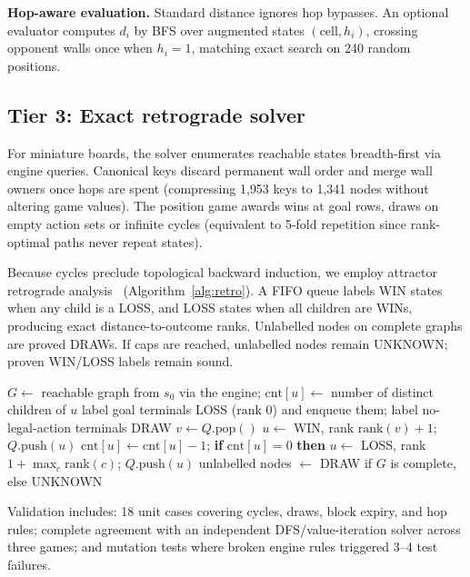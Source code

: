 \documentclass[10pt]{article}
\begin{document}
\textbf{Hop-aware evaluation.} Standard distance ignores hop bypasses. An optional evaluator computes $d_i$ by BFS over augmented states $(\text{cell}, h_i)$, crossing opponent walls once when $h_i=1$, matching exact search on 240 random positions.

\subsection{Tier 3: Exact retrograde solver}
For miniature boards, the solver enumerates reachable states breadth-first via engine queries. Canonical keys discard permanent wall order and merge wall owners once hops are spent (compressing 1{,}953 keys to 1{,}341 nodes without altering game values). The position game awards wins at goal rows, draws on empty action sets or infinite cycles (equivalent to 5-fold repetition since rank-optimal paths never repeat states).

Because cycles preclude topological backward induction, we employ attractor retrograde analysis~\cite{allis1994} (Algorithm~\ref{alg:retro}). A FIFO queue labels WIN states when any child is a LOSS, and LOSS states when all children are WINs, producing exact distance-to-outcome ranks. Unlabelled nodes on complete graphs are proved DRAWs. If caps are reached, unlabelled nodes remain UNKNOWN; proven WIN/LOSS labels remain sound.

\begin{algorithm}[!tb]
\caption{Cycle-aware retrograde solver (values for the side to move)}
\label{alg:retro}
\begin{algorithmic}[1]
\small
\State $G\gets$ reachable graph from $s_0$ via the engine; $\mathrm{cnt}[u]\gets$ number of distinct children of $u$
\State label goal terminals LOSS (rank 0) and enqueue them; label no-legal-action terminals DRAW
  \State $v\gets Q.\mathrm{pop}()$
     \State $u\gets$ WIN, rank $\mathrm{rank}(v)+1$; $Q.\mathrm{push}(u)$
    \Else \State $\mathrm{cnt}[u]\gets\mathrm{cnt}[u]-1$; \textbf{if} $\mathrm{cnt}[u]=0$ \textbf{then} $u\gets$ LOSS, rank $1+\max_{c}\mathrm{rank}(c)$; $Q.\mathrm{push}(u)$
    \EndIf
  \EndFor
\EndWhile
\State unlabelled nodes $\gets$ DRAW if $G$ is complete, else UNKNOWN
\end{algorithmic}
\end{algorithm}

Validation includes: 18 unit cases covering cycles, draws, block expiry, and hop rules; complete agreement with an independent DFS/value-iteration solver across three games; and mutation tests where broken engine rules triggered 3--4 test failures.
\end{document}
